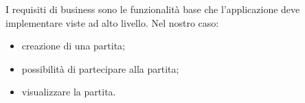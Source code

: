 I requisiti di business sono le funzionalità base che l'applicazione deve implementare viste ad alto livello.
Nel nostro caso:
\begin{itemize}
	\item creazione di una partita;
	\item possibilità di partecipare alla partita;
	\item visualizzare la partita.
\end{itemize}